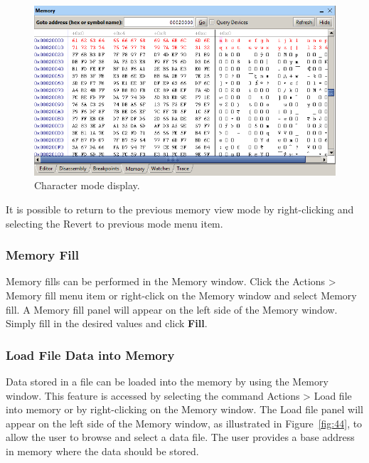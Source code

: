 \documentclass[11pt, twoside, pdftex]{article}
\begin{document}
\begin{figure}[H]
   \begin{center}
      \includegraphics[scale=0.7]{screenshots/figure43.png}
   \end{center}
   \caption{Character mode display.}
	 \label{fig:43}
\end{figure}

It is possible to return to the previous memory view mode by
right-clicking and selecting the {\sf Revert to previous mode}
menu item.


\subsubsection{Memory Fill}

Memory fills can be performed in the Memory window. Click the
{\sf Actions > Memory fill} menu item or right-click on the
Memory window and select {\sf Memory fill}. 
A {\sf Memory fill} panel will appear on the left side of the
Memory window. Simply fill in the desired values and 
click {\bf Fill}. 

\subsubsection{Load File Data into Memory}

Data stored in a file can be loaded into the memory by using the
Memory window. This feature is accessed by selecting the command
{\sf Actions > Load file into memory} or by right-clicking on the
Memory window. The {\sf Load file} panel will appear on the left
side of the Memory window, as illustrated in Figure~\ref{fig:44}, to allow
the user to browse and select a data file.  The user provides a base address in memory where the data should be stored. 
\end{document}
